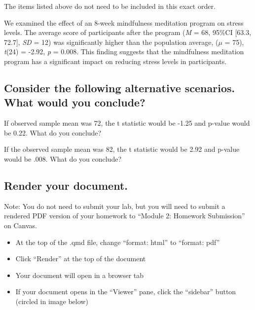 \documentclass[
  letterpaper,
  DIV=11,
  numbers=noendperiod]{scrartcl}
\providecommand{\tightlist}{%
  \setlength{\itemsep}{0pt}\setlength{\parskip}{0pt}}\usepackage{longtable,booktabs,array}
\begin{document}
\begin{tcolorbox}[enhanced jigsaw, opacityback=0, colbacktitle=quarto-callout-note-color!10!white, colback=white, toptitle=1mm, title=\textcolor{quarto-callout-note-color}{\faInfo}\hspace{0.5em}{Note}, left=2mm, colframe=quarto-callout-note-color-frame, coltitle=black, bottomtitle=1mm, titlerule=0mm, leftrule=.75mm, toprule=.15mm, rightrule=.15mm, bottomrule=.15mm, arc=.35mm, opacitybacktitle=0.6, breakable]

The items listed above do not need to be included in this exact order.

\end{tcolorbox}

We examined the effect of an 8-week mindfulness meditation program on
stress levels. The average score of participants after the program
(\emph{M} = 68, 95\%CI {[}63.3, 72.7{]}, \emph{SD} = 12) was
significantly higher than the population average, (\(\mu\) = 75),
\emph{t}(24) = -2.92, \emph{p} = 0.008. This finding suggests that the
mindfulness meditation program has a significant impact on reducing
stress levels in participants.

\subsection{Consider the following alternative scenarios. What would you
conclude?}\label{consider-the-following-alternative-scenarios.-what-would-you-conclude}

If observed sample mean was 72, the t statistic would be -1.25 and
p-value would be 0.22. What do you conclude?

If the observed sample mean was 82, the t statistic would be 2.92 and
p-value would be .008. What do you conclude?

\subsection{Render your document.}\label{render-your-document.}

Note: You do not need to submit your lab, but you will need to submit a
rendered PDF version of your homework to ``Module 2: Homework
Submission'' on Canvas.

\begin{itemize}
\tightlist
\item
  At the top of the .qmd file, change ``format: html'' to ``format:
  pdf''
\item
  Click ``Render'' at the top of the document
\item
  Your document will open in a browser tab
\item
  If your document opens in the ``Viewer'' pane, click the ``sidebar''
  button (circled in image below)
\end{itemize}
\end{document}
